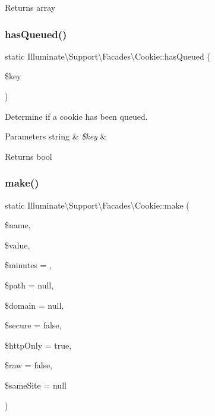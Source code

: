 \begin{DoxyReturn}{Returns}
array 
\end{DoxyReturn}
\mbox{\label{class_illuminate_1_1_support_1_1_facades_1_1_cookie_a044ed9de6b432c56f78571b56b834f57}} 
\subsubsection{\texorpdfstring{has\+Queued()}{hasQueued()}}
{\footnotesize\ttfamily static Illuminate\textbackslash{}\+Support\textbackslash{}\+Facades\textbackslash{}\+Cookie\+::has\+Queued (\begin{DoxyParamCaption}\item[{}]{\$key }\end{DoxyParamCaption})\hspace{0.3cm}{\ttfamily [static]}}

Determine if a cookie has been queued.


\begin{DoxyParams}[1]{Parameters}
string & {\em \$key} & \\
\hline
\end{DoxyParams}
\begin{DoxyReturn}{Returns}
bool 
\end{DoxyReturn}
\mbox{\label{class_illuminate_1_1_support_1_1_facades_1_1_cookie_afd4e81472bf1dcdc75900bef6a35718d}} 
\subsubsection{\texorpdfstring{make()}{make()}}
{\footnotesize\ttfamily static Illuminate\textbackslash{}\+Support\textbackslash{}\+Facades\textbackslash{}\+Cookie\+::make (\begin{DoxyParamCaption}\item[{}]{\$name,  }\item[{}]{\$value,  }\item[{}]{\$minutes = {},  }\item[{}]{\$path = {\ttfamily null},  }\item[{}]{\$domain = {\ttfamily null},  }\item[{}]{\$secure = {\ttfamily false},  }\item[{}]{\$http\+Only = {\ttfamily true},  }\item[{}]{\$raw = {\ttfamily false},  }\item[{}]{\$same\+Site = {\ttfamily null} }\end{DoxyParamCaption})\hspace{0.3cm}{\ttfamily [static]}}

